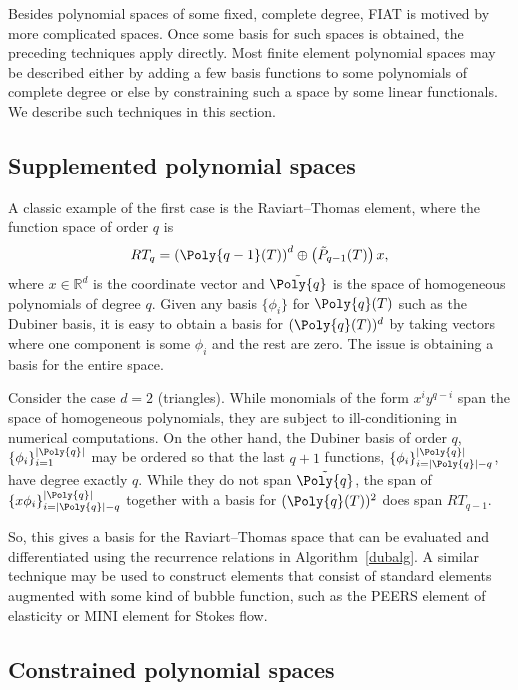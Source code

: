 Besides polynomial spaces of some fixed, complete degree, FIAT is motived
by more complicated spaces.  Once some basis for such spaces is obtained,
the preceding techniques apply directly.  Most finite element polynomial
spaces may be described either by adding a few basis functions to some
polynomials of complete degree or else by constraining such a space by
some linear functionals.  We describe such techniques in this section.

\subsection{Supplemented polynomial spaces}

A classic example of the first case is the Raviart--Thomas element,
where the function space of order \(q \) is
\[
RT_q = \left( \Poly{q-1}(T) \right)^d \oplus \left( \tilde{P}_{q-1}(T) \right) x,
\]
where \( x \in \mathbb{R}^d \) is the coordinate vector and \( \tilde{\Poly{q}}
\) is the space of homogeneous polynomials of degree \( q \).  Given any
basis \( \{ \phi_i \} \) for \( \Poly{q}(T) \) such as the Dubiner basis, it
is easy to obtain a basis for \( (\Poly{q}(T))^d \) by taking vectors where
one component is some \( \phi_i \) and the rest are zero.  The issue is
obtaining a basis for the entire space.

Consider the case \( d = 2 \) (triangles).  While monomials of the form
\( x^i y^{q-i} \) span the space of homogeneous polynomials, they are
subject to ill-conditioning in numerical computations.  On the other
hand, the Dubiner basis of order \( q \), \( \{ \phi_i \}_{i=1}^{|\Poly{q}|}
\) may be ordered so that the last \( q + 1 \) functions, \( \{ \phi_i
\}_{i=|\Poly{q}|-q}^{|\Poly{q}|} \), have degree exactly \( q \).  While they do not
span \( \tilde{\Poly{q}} \), the span of \( \{ x \phi_i \}_{i=|\Poly{q}|-q}^{|\Poly{q}|}
\) together with a basis for \( (\Poly{q}(T))^2 \) does span \( RT_{q-1} \).

So, this gives a basis for the Raviart--Thomas space that can be
evaluated and differentiated using the recurrence relations in
Algorithm~\ref{dubalg}.  A similar technique may be used to construct
elements that consist of standard elements augmented with some kind of
bubble function, such as the PEERS element of elasticity or MINI
element for Stokes flow.

\subsection{Constrained polynomial spaces}

